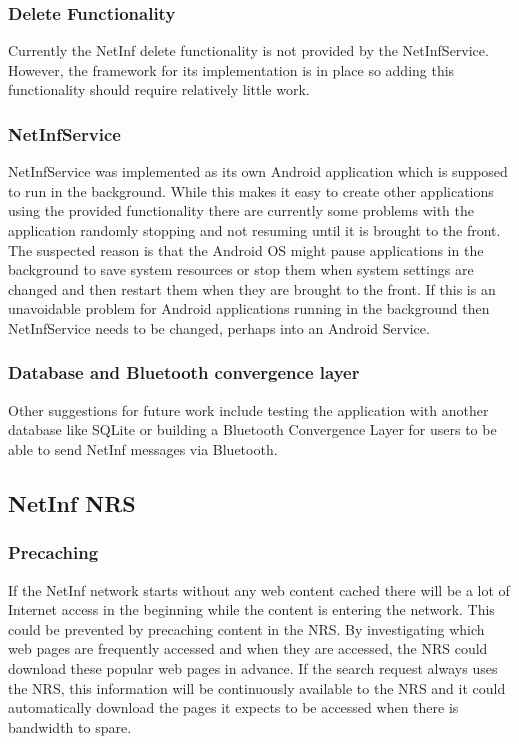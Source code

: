 \subsubsection{Delete Functionality}

Currently the NetInf delete functionality is not provided by the NetInfService. However, the framework for its 
implementation is in place so adding this functionality should require relatively little work.

\subsubsection{NetInfService}

NetInfService was implemented as its own Android application which is supposed to run in the background. 
While this makes it easy to create other applications using the provided functionality there are currently some 
problems with the application randomly stopping and not resuming until it is brought to the front. The suspected 
reason is that the Android OS might pause applications in the background to save system resources or stop them 
when system settings are changed and then restart them when they are brought to the front. If this is an unavoidable 
problem for Android applications running in the background then NetInfService needs to be changed, perhaps into an Android Service.

\subsubsection{Database and Bluetooth convergence layer}

Other suggestions for future work include testing the application with another database like SQLite or building a
Bluetooth Convergence Layer for users to be able to send NetInf messages via Bluetooth. 

\subsection{NetInf NRS}

\subsubsection{Precaching}

If the NetInf network starts without any web content cached there will be a lot of Internet access in the beginning 
while the content is entering the network. This could be prevented by precaching content in the NRS. By investigating 
which web pages are frequently accessed and when they are accessed, the NRS could download these popular web pages in 
advance. If the search request always uses the NRS, this information will be continuously available to the NRS and it 
could automatically download the pages it expects to be accessed when there is bandwidth to spare.


